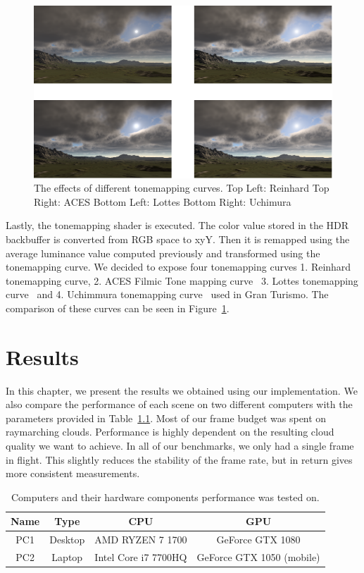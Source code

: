 \documentclass{ctuthesis}
\begin{document}
\begin{figure}
        \includegraphics[width=1.0\textwidth]{media/Tonemapping_effects.png}
        \caption[Tonemapping curves comparison]{The effects of different tonemapping curves.
            Top Left: Reinhard Top Right: ACES Bottom Left: Lottes Bottom Right: Uchimura}
        \label{fig:Tonemapping Curves}
\end{figure}

Lastly, the tonemapping shader is executed. The color value stored in the HDR backbuffer is 
converted from RGB space to xyY. Then it is remapped using the average luminance value computed 
previously and transformed using the tonemapping curve. We decided to expose
four tonemapping curves 1. Reinhard tonemapping curve, 2. ACES Filmic Tone mapping curve~\cite{narkowicz2016aces}
3. Lottes tonemapping curve~\cite{lottes2016} and 4. Uchimmura tonemapping curve~\cite{uchimura2018practical} 
used in Gran Turismo. The comparison of these curves can be seen in Figure~\ref{fig:Tonemapping Curves}.

\chapter{Results}
In this chapter, we present the results we obtained using our implementation.
We also compare the performance of each scene on two different computers with the parameters provided in Table~\ref{tab:Pc Specs}.
Most of our frame budget was spent on raymarching clouds. Performance is highly dependent on the 
resulting cloud quality we want to achieve. In all of our benchmarks, we only had a single
frame in flight. This slightly reduces the stability of the frame rate, but in return gives more consistent measurements.


\begin{center}
\begin{table}[h]
\begin{tabular}{ ||c|c|c|c|| } 
\hline
Name & Type  & CPU & GPU \\
\hline
PC1 & Desktop & AMD RYZEN 7 1700 & GeForce GTX 1080 \\
\hline
PC2 & Laptop & Intel Core i7 7700HQ & GeForce GTX 1050 (mobile)\\
\hline
\end{tabular}
\caption[PC specs]{\label{tab:Pc Specs} Computers and their hardware components performance was tested on.}
\end{table}
\end{center}
\end{document}
